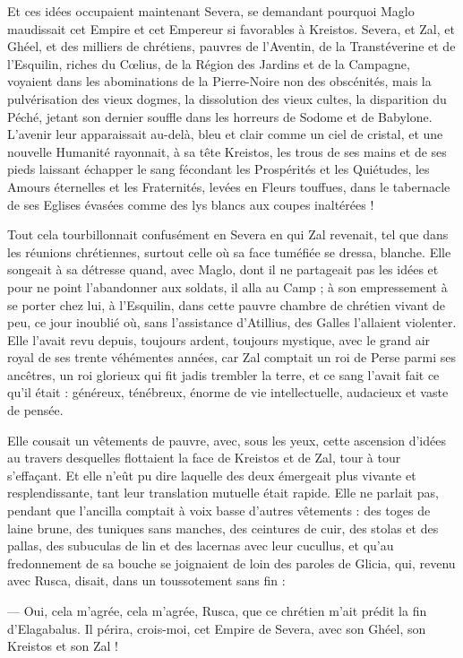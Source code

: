 \documentclass[a4paper, 11pt, oneside, polutonikogreek, french]{article}
\begin{document}
Et ces idées occupaient maintenant Severa, se demandant pourquoi Maglo maudissait cet Empire et cet Empereur si favorables à Kreistos. Severa, et Zal, et Ghéel, et des milliers de chrétiens, pauvres de l'Aventin, de la Transtéverine et de l'Esquilin, riches du Cœlius, de la Région des Jardins et de la Campagne, voyaient dans les abominations de la Pierre-Noire non des obscénités, mais la pulvérisation des vieux dogmes, la dissolution des vieux cultes, la disparition du Péché, jetant son dernier souffle dans les horreurs de Sodome et de Babylone. L'avenir leur apparaissait au-delà, bleu et clair comme un ciel de cristal, et une nouvelle Humanité rayonnait, à sa tête Kreistos, les trous de ses mains et de ses pieds laissant échapper le sang fécondant les Prospérités et les Quiétudes, les Amours éternelles et les Fraternités, levées en Fleurs touffues, dans le tabernacle de ses Eglises évasées comme des lys blancs aux coupes inaltérées !

Tout cela tourbillonnait confusément en Severa en qui Zal revenait, tel que dans les réunions chrétiennes, surtout celle où sa face tuméfiée se dressa, blanche. Elle songeait à sa détresse quand, avec Maglo, dont il ne partageait pas les idées et pour ne point l'abandonner aux soldats, il alla au Camp ; à son empressement à se porter chez lui, à l'Esquilin, dans cette pauvre chambre de chrétien vivant de peu, ce jour inoublié où, sans l'assistance d'Atillius, des Galles l'allaient violenter. Elle l'avait revu depuis, toujours ardent, toujours mystique, avec le grand air royal de ses trente véhémentes années, car Zal comptait un roi de Perse parmi ses ancêtres, un roi glorieux qui fit jadis trembler la terre, et ce sang l'avait fait ce qu'il était : généreux, ténébreux, énorme de vie intellectuelle, audacieux et vaste de pensée.

Elle cousait un vêtements de pauvre, avec, sous les yeux, cette ascension d'idées au travers desquelles flottaient la face de Kreistos et de Zal, tour à tour s'effaçant. Et elle n'eût pu dire laquelle des deux émergeait plus vivante et resplendissante, tant leur translation mutuelle était rapide. Elle ne parlait pas, pendant que l'ancilla comptait à voix basse d'autres vêtements : des toges de laine brune, des tuniques sans manches, des ceintures de cuir, des stolas et des pallas, des subuculas de lin et des lacernas avec leur cucullus, et qu'au fredonnement de sa bouche se joignaient de loin des paroles de Glicia, qui, revenu avec Rusca, disait, dans un toussotement sans fin :

--- Oui, cela m'agrée, cela m'agrée, Rusca, que ce chrétien m'ait prédit la fin d'Elagabalus. Il périra, crois-moi, cet Empire de Severa, avec son Ghéel, son Kreistos et son Zal !
\clearpage
\end{document}
